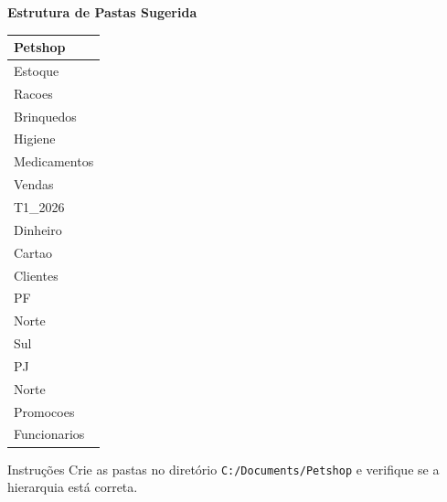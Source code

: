 \documentclass[12pt]{article}
\begin{document}
\begin{table}[H]
\centering
\small
\textbf{Estrutura de Pastas Sugerida}\\
\begin{tabular}{l}
\hline
\rowcolor{tableheader} \textbf{Petshop} \\ \hline
\quad Estoque \\
\quad\quad Racoes \\
\quad\quad Brinquedos \\
\quad\quad Higiene \\
\quad\quad Medicamentos \\
\quad Vendas \\
\quad\quad T1\_2026 \\
\quad\quad\quad Dinheiro \\
\quad\quad\quad Cartao \\
\quad Clientes \\
\quad\quad PF \\
\quad\quad\quad Norte \\
\quad\quad\quad Sul \\
\quad\quad PJ \\
\quad\quad\quad Norte \\
\quad Promocoes \\
\quad Funcionarios \\
\hline
\end{tabular}
\end{table}

\begin{block}{Instruções}
Crie as pastas no diretório \texttt{C:/Documents/Petshop} e verifique se a hierarquia está correta.
\end{block}
\end{document}
